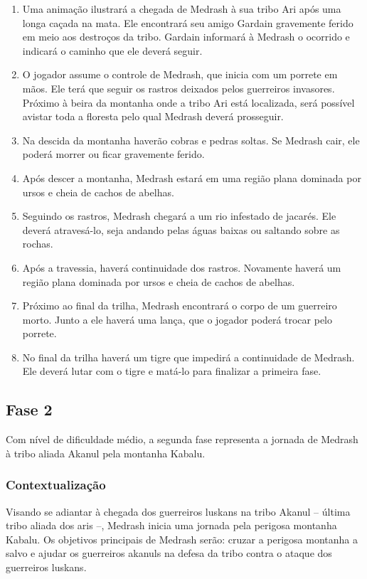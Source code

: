 \begin{enumerate}
\item Uma animação ilustrará a chegada de Medrash à sua tribo Ari após uma longa caçada na mata. Ele encontrará seu amigo Gardain gravemente ferido em meio aos destroços da tribo. Gardain informará à Medrash o ocorrido e indicará o caminho que ele deverá seguir.
\item O jogador assume o controle de Medrash, que inicia com um porrete em mãos. Ele terá que seguir os rastros deixados pelos guerreiros invasores. Próximo à beira da montanha onde a tribo Ari está localizada, será possível avistar toda a floresta pelo qual Medrash deverá prosseguir.
\item Na descida da montanha haverão cobras e pedras soltas. Se Medrash cair, ele poderá morrer ou ficar gravemente ferido.
\item Após descer a montanha, Medrash estará em uma região plana dominada por ursos e cheia de cachos de abelhas.
\item Seguindo os rastros, Medrash chegará a um rio infestado de jacarés. Ele deverá atravesá-lo, seja andando pelas águas baixas ou saltando sobre as rochas.
\item Após a travessia, haverá continuidade dos rastros. Novamente haverá um região plana dominada por ursos e cheia de cachos de abelhas.
\item Próximo ao final da trilha, Medrash encontrará o corpo de um guerreiro morto. Junto a ele haverá uma lança, que o jogador poderá trocar pelo porrete.
\item No final da trilha haverá um tigre que impedirá a continuidade de Medrash. Ele deverá lutar com o tigre e matá-lo para finalizar a primeira fase.
\end{enumerate}

\subsection{Fase 2}

Com nível de dificuldade médio, a segunda fase representa a jornada de Medrash à tribo aliada Akanul pela montanha Kabalu.

\subsubsection{Contextualização}

Visando se adiantar à chegada dos guerreiros luskans na tribo Akanul -- última tribo aliada dos aris --, Medrash inicia uma jornada pela perigosa montanha Kabalu. Os objetivos principais de Medrash serão: cruzar a perigosa montanha a salvo e ajudar os guerreiros akanuls na defesa da tribo contra o ataque dos guerreiros luskans.

